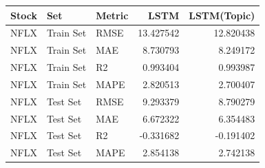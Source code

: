 \begin{tabular}{lllrr}
\toprule
Stock & Set & Metric & LSTM & LSTM(Topic) \\
\midrule
NFLX & Train Set & RMSE & 13.427542 & 12.820438 \\
NFLX & Train Set & MAE & 8.730793 & 8.249172 \\
NFLX & Train Set & R2 & 0.993404 & 0.993987 \\
NFLX & Train Set & MAPE & 2.820513 & 2.700407 \\
NFLX & Test Set & RMSE & 9.293379 & 8.790279 \\
NFLX & Test Set & MAE & 6.672322 & 6.354483 \\
NFLX & Test Set & R2 & -0.331682 & -0.191402 \\
NFLX & Test Set & MAPE & 2.854138 & 2.742138 \\
\bottomrule
\end{tabular}
